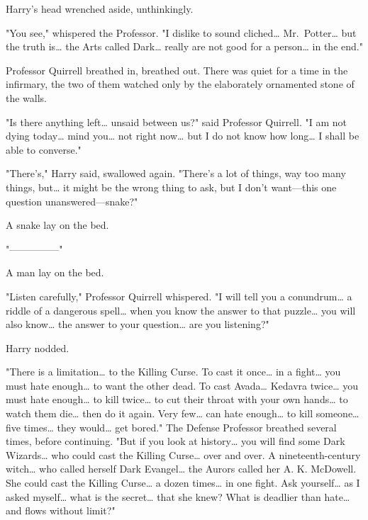 Harry's head wrenched aside, unthinkingly.

"You see," whispered the Professor. "I dislike to sound cliched{\ldots}
Mr.~Potter{\ldots} but the truth is{\ldots} the Arts called Dark{\ldots} really
are not good for a person{\ldots} in the end."

Professor Quirrell breathed in, breathed out. There was quiet for a time in the
infirmary, the two of them watched only by the elaborately ornamented stone of
the walls.

"Is there anything left{\ldots} unsaid between us?" said Professor Quirrell. "I
am not dying today{\ldots} mind you{\ldots} not right now{\ldots} but I do not
know how long{\ldots} I shall be able to converse."

"There's," Harry said, swallowed again. "There's a lot of things, way too many
things, but{\ldots} it might be the wrong thing to ask, but I don't want---this
one question unanswered---snake?"

A snake lay on the bed.

"---------------"

A man lay on the bed.

"Listen carefully," Professor Quirrell whispered. "I will tell you a
conundrum{\ldots} a riddle of a dangerous spell{\ldots} when you know the
answer to that puzzle{\ldots} you will also know{\ldots} the answer to your
question{\ldots} are you listening?"

Harry nodded.

"There is a limitation{\ldots} to the Killing Curse. To cast it once{\ldots} in
a fight{\ldots} you must hate enough{\ldots} to want the other dead. To cast
Avada{\ldots} Kedavra twice{\ldots} you must hate enough{\ldots} to kill
twice{\ldots} to cut their throat with your own hands{\ldots} to watch them
die{\ldots} then do it again. Very few{\ldots} can hate enough{\ldots} to kill
someone{\ldots} five times{\ldots} they would{\ldots} get bored." The Defense
Professor breathed several times, before continuing. "But if you look at
history{\ldots} you will find some Dark Wizards{\ldots} who could cast the
Killing Curse{\ldots} over and over. A nineteenth-century witch{\ldots} who
called herself Dark Evangel{\ldots} the Aurors called her A. K. McDowell. She
could cast the Killing Curse{\ldots} a dozen times{\ldots} in one fight. Ask
yourself{\ldots} as I asked myself{\ldots} what is the secret{\ldots} that she
knew? What is deadlier than hate{\ldots} and flows without limit?"

